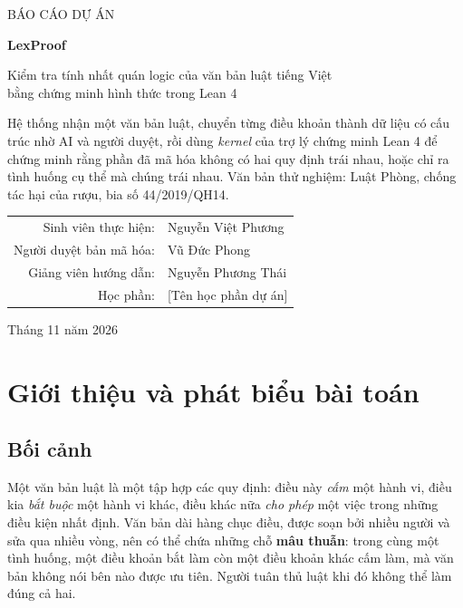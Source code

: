\documentclass[12pt,a4paper]{article}
\newcommand{\term}[1]{\textbf{#1}}
\begin{document}
\begin{titlepage}
\centering
\vspace*{1.2cm}
{\large BÁO CÁO DỰ ÁN\par}
\vspace{1.6cm}
{\fontsize{30}{36}\selectfont\bfseries\color{accent} LexProof\par}
\vspace{0.6cm}
{\Large Kiểm tra tính nhất quán logic của văn bản luật tiếng Việt\\ bằng chứng minh hình thức trong Lean 4\par}
\vspace{1.4cm}
\begin{tcolorbox}[colback=soft,colframe=accent,boxrule=0.6pt,arc=2pt,width=0.86\textwidth]
\small Hệ thống nhận một văn bản luật, chuyển từng điều khoản thành dữ liệu có cấu trúc nhờ AI và người duyệt, rồi dùng
\emph{kernel} của trợ lý chứng minh Lean 4 để chứng minh rằng phần đã mã hóa không có hai quy định trái nhau, hoặc chỉ ra
tình huống cụ thể mà chúng trái nhau. Văn bản thử nghiệm: Luật Phòng, chống tác hại của rượu, bia số 44/2019/QH14.
\end{tcolorbox}
\vfill
\begin{tabular}{rl}
Sinh viên thực hiện: & Nguyễn Việt Phương\\
Người duyệt bản mã hóa: & Vũ Đức Phong\\
Giảng viên hướng dẫn: & Nguyễn Phương Thái\\
Học phần: & [Tên học phần dự án]\\
\end{tabular}
\vspace{1.2cm}

{\large Tháng 11 năm 2026\par}
\end{titlepage}

\tableofcontents
\clearpage

\section{Giới thiệu và phát biểu bài toán}

\subsection{Bối cảnh}

Một văn bản luật là một tập hợp các quy định: điều này \emph{cấm} một hành vi, điều kia \emph{bắt buộc} một hành vi khác,
điều khác nữa \emph{cho phép} một việc trong những điều kiện nhất định. Văn bản dài hàng chục điều, được soạn bởi nhiều người
và sửa qua nhiều vòng, nên có thể chứa những chỗ \term{mâu thuẫn}: trong cùng một tình huống, một điều khoản bắt làm
còn một điều khoản khác cấm làm, mà văn bản không nói bên nào được ưu tiên. Người tuân thủ luật khi đó không thể làm đúng cả
hai.
\end{document}
